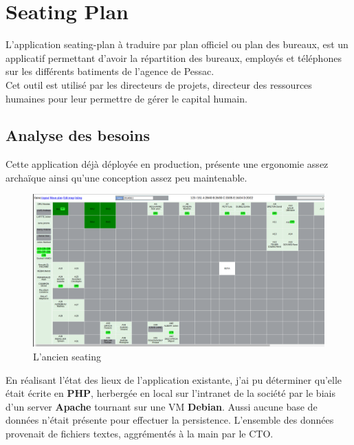 \documentclass{report}
\begin{document}
\newpage



\chapter{Seating Plan}

L'application \gls{seating-plan} à traduire par plan officiel ou plan des bureaux, est un applicatif permettant d'avoir la répartition des bureaux, employés et téléphones sur les différents batiments de l'agence de Pessac. \\ 
Cet outil est utilisé par les directeurs de projets, directeur des ressources humaines pour leur permettre de gérer le capital humain. 


\section{Analyse des besoins}
Cette application déjà déployée en production, présente une ergonomie assez archaïque ainsi qu'une conception assez peu maintenable. \\


\begin{figure}[h!]
	\centering
	\includegraphics[width=1\textwidth]{assets/screenshot/old_seating.png}
	\caption{L'ancien seating}
\end{figure}

En réalisant l'état des lieux de l'application existante, j'ai pu déterminer qu'elle était écrite en \textbf{\gls{PHP}}, herbergée en local sur l'intranet de la société par le biais d'un server \textbf{\gls{Apache}} tournant sur une \gls{VM} \textbf{\gls{Debian}}. Aussi aucune base de données n'était présente pour effectuer la persistence. L'ensemble des données provenait de fichiers textes, aggrémentés à la main par le \gls{CTO}.  
\end{document}
